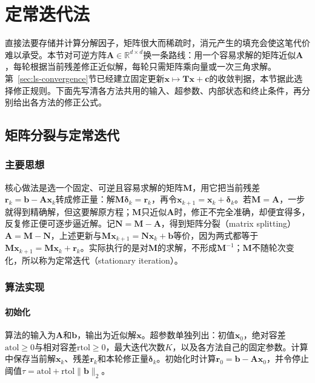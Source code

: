 \section{定常迭代法}
\label{sec:ls-stationary-iterations}

直接法要存储并计算分解因子，矩阵很大而稀疏时，消元产生的填充会使这笔代价难以承受。本节对可逆方阵$\bm A\in\mathbb R^{d\times d}$换一条路线：用一个容易求解的矩阵近似$\bm A$，每轮根据当前残差修正近似解，每轮只需矩阵乘向量或一次三角求解。第~\ref{sec:ls-convergence}节已经建立固定更新$\bm x\mapsto\bm T\bm x+\bm c$的收敛判据，本节据此选择修正规则。下面先写清各方法共用的输入、超参数、内部状态和终止条件，再分别给出各方法的修正公式。

\subsection{矩阵分裂与定常迭代}
\label{sec:ls-matrix-splitting}

\subsubsection{主要思想}

核心做法是选一个固定、可逆且容易求解的矩阵$\bm M$，用它把当前残差$\bm r_k=\bm b-\bm A\bm x_k$转成修正量：解$\bm M\bm\delta_k=\bm r_k$，再令$\bm x_{k+1}=\bm x_k+\bm\delta_k$。若$\bm M=\bm A$，一步就得到精确解，但这要解原方程；$\bm M$只近似$\bm A$时，修正不完全准确，却便宜得多，反复修正便可逐步逼近解。记$\bm N=\bm M-\bm A$，得到矩阵分裂（matrix splitting）$\bm A=\bm M-\bm N$，上述更新与$\bm M\bm x_{k+1}=\bm N\bm x_k+\bm b$等价，因为两式都等于$\bm M\bm x_{k+1}=\bm M\bm x_k+\bm r_k$。实际执行的是对$\bm M$的求解，不形成$\bm M^{-1}$；$\bm M$不随轮次变化，所以称为定常迭代（stationary iteration）。

\subsubsection{算法实现}

\paragraph{初始化}
算法的输入为$\bm A$和$\bm b$，输出为近似解$\bm x$。超参数单独列出：初值$\bm x_0$，绝对容差$\mathrm{atol}\geq0$与相对容差$\mathrm{rtol}\geq0$，最大迭代次数$K$，以及各方法自己的固定参数。计算中保存当前解$\bm x_k$、残差$\bm r_k$和本轮修正量$\bm\delta_k$。初始化时计算$\bm r_0=\bm b-\bm A\bm x_0$，并令停止阈值$\tau=\mathrm{atol}+\mathrm{rtol}\lVert\bm b\rVert_2$。

